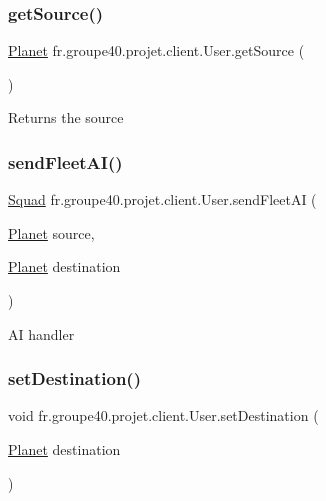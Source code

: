 \subsubsection{\texorpdfstring{get\+Source()}{getSource()}}
{\footnotesize\ttfamily \mbox{\hyperlink{classfr_1_1groupe40_1_1projet_1_1model_1_1planets_1_1_planet}{Planet}} fr.\+groupe40.\+projet.\+client.\+User.\+get\+Source (\begin{DoxyParamCaption}{ }\end{DoxyParamCaption})}

\begin{DoxyReturn}{Returns}
the source 
\end{DoxyReturn}
\mbox{\label{classfr_1_1groupe40_1_1projet_1_1client_1_1_user_a32007a7692972de524c9a03c813b97d1}} 
\subsubsection{\texorpdfstring{send\+Fleet\+A\+I()}{sendFleetAI()}}
{\footnotesize\ttfamily \mbox{\hyperlink{classfr_1_1groupe40_1_1projet_1_1model_1_1ships_1_1_squad}{Squad}} fr.\+groupe40.\+projet.\+client.\+User.\+send\+Fleet\+AI (\begin{DoxyParamCaption}\item[{\mbox{\hyperlink{classfr_1_1groupe40_1_1projet_1_1model_1_1planets_1_1_planet}{Planet}}}]{source,  }\item[{\mbox{\hyperlink{classfr_1_1groupe40_1_1projet_1_1model_1_1planets_1_1_planet}{Planet}}}]{destination }\end{DoxyParamCaption})}

AI handler \mbox{\label{classfr_1_1groupe40_1_1projet_1_1client_1_1_user_a4b36462569cbce5ac7c47ea1394f9a4c}} 
\subsubsection{\texorpdfstring{set\+Destination()}{setDestination()}}
{\footnotesize\ttfamily void fr.\+groupe40.\+projet.\+client.\+User.\+set\+Destination (\begin{DoxyParamCaption}\item[{\mbox{\hyperlink{classfr_1_1groupe40_1_1projet_1_1model_1_1planets_1_1_planet}{Planet}}}]{destination }\end{DoxyParamCaption})}


